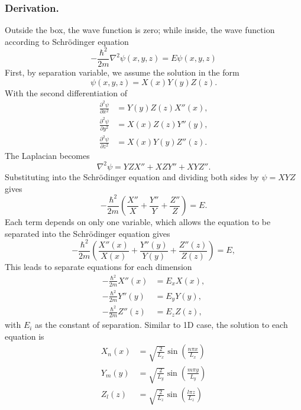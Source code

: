 \documentclass[../../../main.tex]{subfiles}
\begin{document}
\subsubsection{Derivation.}
Outside the box, the wave function is zero; while inside, the wave function according to Schrödinger equation
\begin{equation*}
    -\frac{\hbar^2}{2m} \nabla^2 \psi(x,y,z) = E \psi(x,y,z)
\end{equation*}
First, by separation variable, we assume the solution in the form
\begin{equation*}
    \psi(x,y,z) = X(x) Y(y) Z(z).
\end{equation*}
With the second differentiation of
\begin{align*}
    \frac{\partial^2 \psi}{\partial x^2} & = Y(y) Z(z) X''(x), \\
    \frac{\partial^2 \psi}{\partial y^2} & = X(x) Z(z) Y''(y), \\
    \frac{\partial^2 \psi}{\partial z^2} & = X(x) Y(y) Z''(z).
\end{align*}
The Laplacian becomes
\begin{equation*}
    \nabla^2 \psi = Y Z X'' + X Z Y'' + X Y Z''.
\end{equation*}
Substituting into the Schrödinger equation and dividing both sides by \(\psi = X Y Z\) gives
\begin{equation*}
    -\frac{\hbar^2}{2m} \left( \frac{X''}{X} + \frac{Y''}{Y} + \frac{Z''}{Z} \right) = E.
\end{equation*}
Each term depends on only one variable, which allows the equation to be separated into the Schrödinger equation gives
\begin{equation*}
    -\frac{\hbar^2}{2m} \left( \frac{X''(x)}{X(x)} + \frac{Y''(y)}{Y(y)} + \frac{Z''(z)}{Z(z)} \right) = E,
\end{equation*}
This leads to separate equations for each dimension
\begin{align*}
    -\frac{\hbar^2}{2m} X''(x) & = E_x X(x), \\
    -\frac{\hbar^2}{2m} Y''(y) & = E_y Y(y), \\
    -\frac{\hbar^2}{2m} Z''(z) & = E_z Z(z),
\end{align*}
with $E_i$ as the constant of separation.
Similar to 1D case, the solution to each equation is
\begin{align*}
    X_n(x) & = \sqrt{\frac{2}{L_x}} \sin\left(\frac{n \pi x}{L_x}\right) \\
    Y_m(y) & = \sqrt{\frac{2}{L_y}} \sin\left(\frac{m \pi y}{L_y}\right) \\
    Z_l(z) & = \sqrt{\frac{2}{L_z}} \sin\left(\frac{l \pi z}{L_z}\right)
\end{align*}
\end{document}
